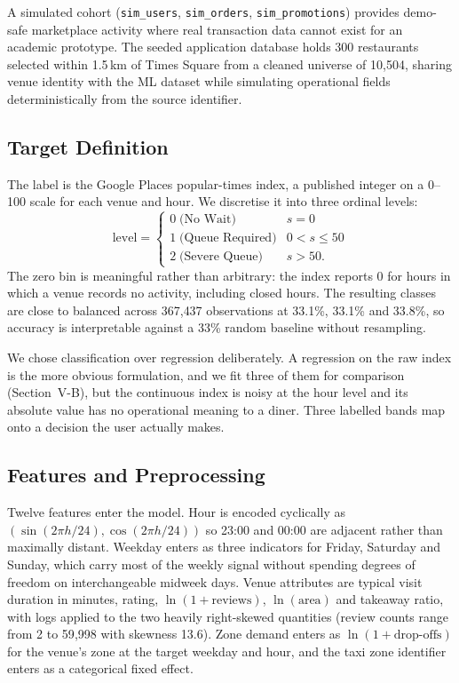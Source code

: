 \documentclass[conference]{IEEEtran}
\begin{document}
A simulated cohort (\texttt{sim\_users}, \texttt{sim\_orders}, \texttt{sim\_promotions}) provides demo-safe marketplace activity where real transaction data cannot exist for an academic prototype. The seeded application database holds 300 restaurants selected within 1.5\,km of Times Square from a cleaned universe of 10{,}504, sharing venue identity with the ML dataset while simulating operational fields deterministically from the source identifier.

\subsection{Target Definition}

The label is the Google Places popular-times index, a published integer on a 0--100 scale for each venue and hour. We discretise it into three ordinal levels:
\begin{equation}
\text{level} =
\begin{cases}
0 \;\text{(No Wait)} & s = 0\\
1 \;\text{(Queue Required)} & 0 < s \le 50\\
2 \;\text{(Severe Queue)} & s > 50.
\end{cases}
\end{equation}
The zero bin is meaningful rather than arbitrary: the index reports 0 for hours in which a venue records no activity, including closed hours. The resulting classes are close to balanced across 367{,}437 observations at 33.1\%, 33.1\% and 33.8\%, so accuracy is interpretable against a 33\% random baseline without resampling.

We chose classification over regression deliberately. A regression on the raw index is the more obvious formulation, and we fit three of them for comparison (Section~V-B), but the continuous index is noisy at the hour level and its absolute value has no operational meaning to a diner. Three labelled bands map onto a decision the user actually makes.

\subsection{Features and Preprocessing}

Twelve features enter the model. Hour is encoded cyclically as $(\sin(2\pi h/24), \cos(2\pi h/24))$ so 23:00 and 00:00 are adjacent rather than maximally distant. Weekday enters as three indicators for Friday, Saturday and Sunday, which carry most of the weekly signal without spending degrees of freedom on interchangeable midweek days. Venue attributes are typical visit duration in minutes, rating, $\ln(1+\text{reviews})$, $\ln(\text{area})$ and takeaway ratio, with logs applied to the two heavily right-skewed quantities (review counts range from 2 to 59{,}998 with skewness 13.6). Zone demand enters as $\ln(1+\text{drop-offs})$ for the venue's zone at the target weekday and hour, and the taxi zone identifier enters as a categorical fixed effect.
\end{document}

